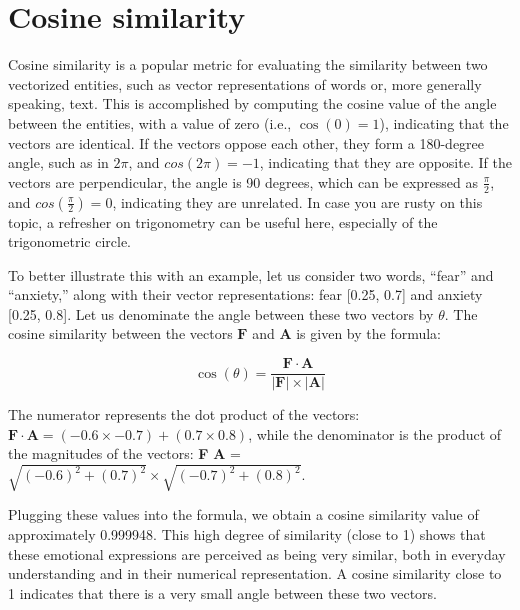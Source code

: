 \section{Cosine similarity}\label{cosine-similarity-1}

Cosine similarity is a popular metric for evaluating the similarity between
two vectorized entities, such as vector representations of words or,
more generally speaking, text. This is accomplished by computing the
cosine value of the angle between the entities, with a value of zero (i.e.,
\(\cos(0)=1\)), indicating that the vectors are identical. If the vectors
oppose each other, they form a 180-degree angle, such as in \(2\pi\), and
\(cos(2\pi)=-1\), indicating that they are opposite. If the vectors are
perpendicular, the angle is 90 degrees, which can be expressed as
\(\frac{\pi}{2}\), and \(cos(\frac{\pi}{2})=0\), indicating
they are unrelated. In case you are rusty on this topic, a refresher on
trigonometry can be useful here, especially of the trigonometric circle.

To better illustrate this with an example, let us consider two words,
``fear'' and ``anxiety,'' along with their vector representations: fear
{[}0.25, 0.7{]} and anxiety {[}0.25, 0.8{]}. Let us denominate the angle
between these two vectors by \(\theta\). The cosine similarity between
the vectors \(\mathbf{F}\) and \(\mathbf{A}\) is given by the formula:

\[
\cos(\theta) = \frac{\mathbf{F} \cdot \mathbf{A}}{|\mathbf{F}| \times |\mathbf{A}|}
\]

The numerator represents the dot product of the vectors:
\(\textbf{F} \cdot \textbf{A} = (-0.6 \times -0.7) + (0.7 \times 0.8)\),
while the denominator is the product of the magnitudes of the vectors:
\textbar{}\textbf{F}\textbar{} \times \textbar{}\textbf{A}\textbar{} =
\(\sqrt{(-0.6)^2 + (0.7)^2} \times \sqrt{(-0.7)^2 + (0.8)^2}\).

Plugging these values into the formula, we obtain a cosine similarity
value of approximately 0.999948. This high degree of similarity (close to 1)
shows that these emotional expressions are perceived as being very similar,
both in everyday understanding and in their numerical representation. A
cosine similarity close to 1 indicates that there is a very small angle
between these two vectors.

